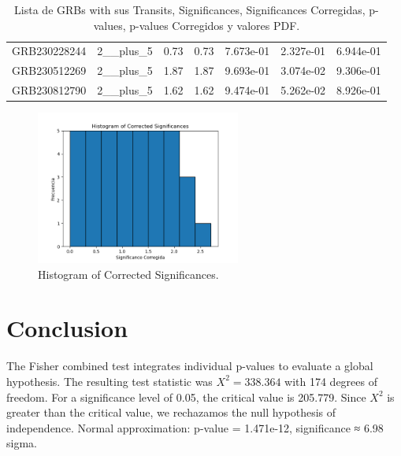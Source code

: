 \documentclass[12pt]{article}
\begin{document}
\begin{table}[h!]
{\begin{tabular}{l c c c c c c}
GRB230228244 & 2__plus_5 & 0.73 & 0.73 & 7.673e-01 & 2.327e-01 & 6.944e-01 \\
GRB230512269 & 2__plus_5 & 1.87 & 1.87 & 9.693e-01 & 3.074e-02 & 9.306e-01 \\
GRB230812790 & 2__plus_5 & 1.62 & 1.62 & 9.474e-01 & 5.262e-02 & 8.926e-01 \\
\bottomrule
\end{tabular}%
}
\caption{Lista de GRBs with sus Transits, Significances, Significances Corregidas, p-values, p-values Corregidos y valores PDF.}
\end{table}

\begin{figure}[h!]
\centering
\includegraphics[width=0.6\textwidth]{corrected_significance_hist.png}
\caption{Histogram of Corrected Significances.}
\end{figure}

\section*{Conclusion}
The Fisher combined test integrates individual p-values to evaluate a global hypothesis.
The resulting test statistic was $X^2 = 338.364$ with 174 degrees of freedom.
For a significance level of 0.05, the critical value is 205.779.
Since $X^2$ is greater than the critical value, we rechazamos the null hypothesis of independence.
Normal approximation: p-value = 1.471e-12, significance ≈ 6.98 sigma.
\end{document}
